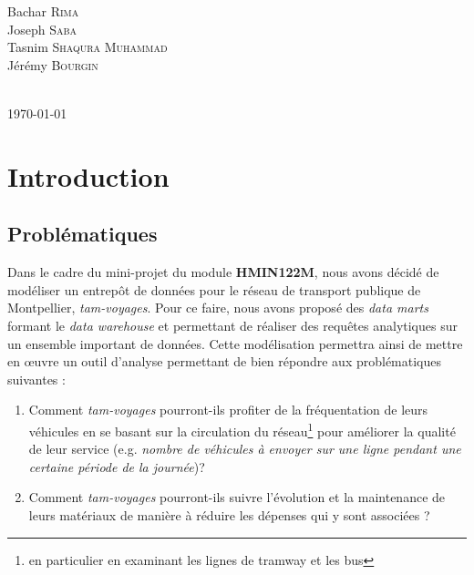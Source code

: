 \documentclass[a4paper,12pt]{report}
\begin{document}
\begin{titlepage}
\begin{minipage}{\textwidth}
\centering \huge
Bachar \textsc{Rima}\\ %
Joseph \textsc{Saba}\\ %
Tasnim \textsc{Shaqura Muhammad}\\ %
Jérémy \textsc{Bourgin} %
\end{minipage} \\[0.8cm]
{\large \today}\\[1cm]
\hspace{\fill}
\vfill %
\end{titlepage}

\pagestyle{plain}

{
  \hypersetup{linkcolor=black}
  \tableofcontents
}

\newpage

\chapter{Introduction}
\section{Problématiques}
Dans le cadre du mini-projet du module \textbf{HMIN122M}, nous avons décidé de modéliser un entrepôt de données pour le réseau de transport publique de Montpellier, \textit{tam-voyages}. Pour ce faire, nous avons proposé des \textit{data marts} formant le \textit{data warehouse} et permettant de réaliser des requêtes analytiques sur un ensemble important de données. Cette modélisation permettra ainsi de mettre en \oe{}uvre un outil d'analyse permettant de bien répondre aux problématiques suivantes :
\begin{enumerate}
  \item Comment \textit{tam-voyages} pourront-ils profiter de la fréquentation de leurs véhicules en se basant sur la circulation du réseau\footnote{en particulier en examinant les lignes de tramway et les bus} pour améliorer la qualité de leur service (e.g. \textit{nombre de véhicules à envoyer sur une ligne pendant une certaine période de la journée})?
  \item Comment \textit{tam-voyages} pourront-ils suivre l'évolution et la maintenance de leurs matériaux de manière à réduire les dépenses qui y sont associées ?
\end{enumerate}
\end{document}
